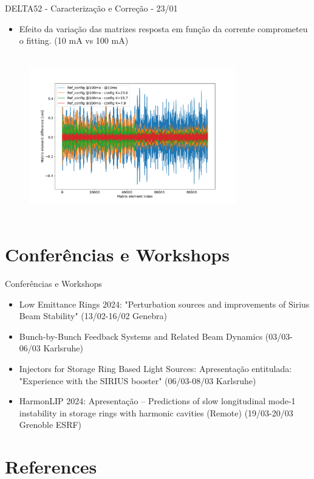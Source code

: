 \documentclass{beamer}					  %
\begin{document}
\begin{frame}{DELTA52 - Caracterização e Correção - 23/01}
    \begin{itemize}
    		\item Efeito da variação das matrizes resposta em função da corrente comprometeu o fitting. (10 mA vs 100 mA)
    \end{itemize}
    \begin{figure}[H]
        	\centering
            \includegraphics[height=7cm, width=9cm]{2024-01-26/figures/Matriz variation.png}\\ 
    \end{figure} 
\end{frame}


\section{Conferências e Workshops}

\begin{frame}{Conferências e Workshops}
    \begin{itemize}
            \item Low Emittance Rings 2024: "Perturbation sources and improvements of Sirius Beam Stability" (13/02-16/02 Genebra)
            \item Bunch-by-Bunch Feedback Systems and Related Beam Dynamics (03/03-06/03 Karlsruhe)
            \item Injectors for Storage Ring Based Light Sources: Apresentação entitulada: "Experience with the SIRIUS booster" (06/03-08/03 Karlsruhe)
            \item HarmonLIP 2024: Apresentação -- Predictions of slow longitudinal mode-1 instability in storage rings with harmonic cavities (Remote) (19/03-20/03 Grenoble ESRF)
    \end{itemize}
\end{frame}





\section{References}
\end{document}
